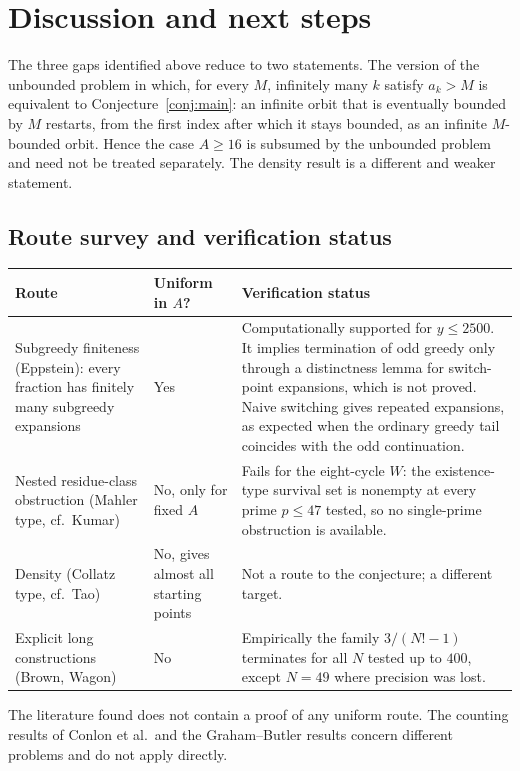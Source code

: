 \documentclass[11pt]{amsart}
\theoremstyle{plain}
\theoremstyle{definition}
\theoremstyle{remark}
\begin{document}
\section{Discussion and next steps}

The three gaps identified above reduce to two statements. The version of the unbounded problem in which, for every $M$, infinitely many $k$ satisfy $a_k>M$ is equivalent to Conjecture~\ref{conj:main}: an infinite orbit that is eventually bounded by $M$ restarts, from the first index after which it stays bounded, as an infinite $M$-bounded orbit. Hence the case $A\ge 16$ is subsumed by the unbounded problem and need not be treated separately. The density result is a different and weaker statement.

\subsection*{Route survey and verification status}

\begin{center}
\begin{tabular}{p{} p{} p{}}
\hline
Route & Uniform in $A$? & Verification status\\
\hline
Subgreedy finiteness (Eppstein): every fraction has finitely many subgreedy expansions & Yes & Computationally supported for $y\le 2500$. It implies termination of odd greedy only through a distinctness lemma for switch-point expansions, which is not proved. Naive switching gives repeated expansions, as expected when the ordinary greedy tail coincides with the odd continuation.\\
Nested residue-class obstruction (Mahler type, cf.\ Kumar) & No, only for fixed $A$ & Fails for the eight-cycle $W$: the existence-type survival set is nonempty at every prime $p\le 47$ tested, so no single-prime obstruction is available.\\
Density (Collatz type, cf.\ Tao) & No, gives almost all starting points & Not a route to the conjecture; a different target.\\
Explicit long constructions (Brown, Wagon) & No & Empirically the family $3/(N!-1)$ terminates for all $N$ tested up to $400$, except $N=49$ where precision was lost.\\
\hline
\end{tabular}
\end{center}

\noindent The literature found does not contain a proof of any uniform route. The counting results of Conlon et al.\ and the Graham–Butler results concern different problems and do not apply directly.
\end{document}
